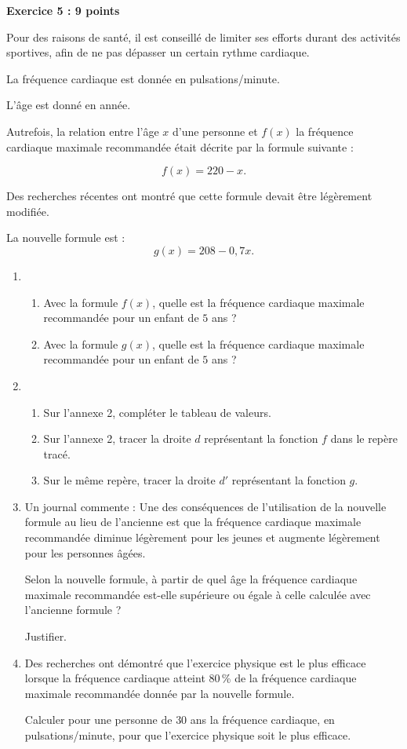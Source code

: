 \documentclass[10pt]{article}
\begin{document}
\textbf{Exercice 5 :  \hfill 9 points}

\medskip

Pour des raisons de santé, il est conseillé de limiter ses efforts durant des activités sportives, afin de ne pas dépasser un certain rythme cardiaque.

La fréquence cardiaque est donnée en pulsations/minute.

L'âge est donné en année.

\smallskip

Autrefois, la relation entre l'âge $x$ d'une personne et $f(x)$ la fréquence cardiaque maximale recommandée était décrite par la formule suivante :

\[f(x) = 220 - x.\]

Des recherches récentes ont montré que cette formule devait être légèrement modifiée.

La nouvelle formule est :
\[g(x) = 208 - 0,7x.\]

\begin{enumerate}
\item 
	\begin{enumerate}
		\item Avec la formule $f(x)$, quelle est la fréquence cardiaque maximale recommandée pour un enfant de $5$ ans ?
		\item Avec la formule $g(x)$, quelle est la fréquence cardiaque maximale recommandée pour un enfant de $5$ ans ?
	\end{enumerate}
\item  
	\begin{enumerate}
		\item Sur l'annexe 2, compléter le tableau de valeurs.
		\item Sur l'annexe 2, tracer la droite $d$ représentant la fonction $f$ dans le repère tracé.
		\item Sur le même repère, tracer la droite $d'$ représentant la fonction $g$.
	\end{enumerate}
\item  Un journal commente : \og Une des conséquences de l'utilisation de la nouvelle formule au lieu de l'ancienne est que la fréquence cardiaque maximale recommandée diminue
légèrement pour les jeunes et augmente légèrement pour les personnes âgées. \fg
	
Selon la nouvelle formule, à partir de quel âge la fréquence cardiaque maximale
recommandée est-elle supérieure ou égale à celle calculée avec l'ancienne formule ?
	
Justifier.
\item  Des recherches ont démontré que l'exercice physique est le plus efficace lorsque la
fréquence cardiaque atteint 80\,\% de la fréquence cardiaque maximale recommandée
donnée par la nouvelle formule.
	
Calculer pour une personne de $30$ ans la fréquence cardiaque, en pulsations/minute, pour
que l'exercice physique soit le plus efficace.
\end{enumerate}
\end{document}
